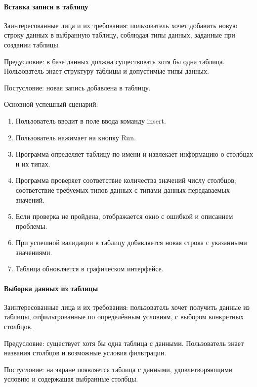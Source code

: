 \paragraph{Вставка записи в таблицу}

Заинтересованные лица и их требования: пользователь хочет добавить новую строку данных в выбранную таблицу, соблюдая типы данных, заданные при создании таблицы.

Предусловие: в базе данных должна существовать хотя бы одна таблица. Пользователь знает структуру таблицы и допустимые типы данных.

Постусловие: новая запись добавлена в таблицу.

Основной успешный сценарий:
\begin{enumerate}
	\item Пользователь вводит в поле ввода команду insert.	
	\item Пользователь нажимает на кнопку Run.	
	\item Программа определяет таблицу по имени и извлекает информацию о столбцах и их типах.
	\item Программа проверяет соответствие количества значений числу столбцов; соответствие требуемых типов данных с типами данных передаваемых значений.	
	\item Если проверка не пройдена, отображается окно с ошибкой и описанием проблемы.	
	\item При успешной валидации в таблицу добавляется новая строка с указанными значениями.	
	\item Таблица обновляется в графическом интерфейсе.
\end{enumerate}

\paragraph{Выборка данных из таблицы}

Заинтересованные лица и их требования: пользователь хочет получить данные из таблицы, отфильтрованные по определённым условиям, с выбором конкретных столбцов.

Предусловие: существует хотя бы одна таблица с данными. Пользователь знает названия столбцов и возможные условия фильтрации.

Постусловие: на экране появляется таблица с данными, удовлетворяющими условию и содержащая выбранные столбцы.

